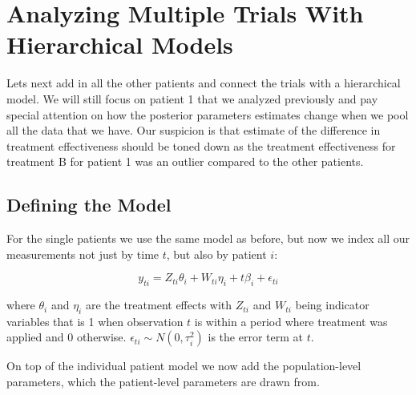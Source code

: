 \documentclass[12pt,a4paper,leqno]{report}
\theoremstyle{plain}
\theoremstyle{definition}
\theoremstyle{remark}
\begin{document}

\section{Analyzing Multiple Trials With Hierarchical Models}\label{pooling}

Lets next add in all the other patients and connect the trials with a hierarchical
model. We will still focus on patient 1 that we analyzed previously and pay special
attention on how the posterior parameters estimates change when we pool all the data
that we have. Our suspicion is that estimate of the difference in treatment effectiveness
should be toned down as the treatment effectiveness for treatment B for patient 1 was an
outlier compared to the other patients.

\subsection{Defining the Model}\label{hiermodel}

For the single patients we use the same model as before, but now we index all our
measurements not just by time \(t\), but also by patient \(i\):

\begin{def}\label{simplesinglepatientmodel}
    \begin{equation}\label{}
        y_{ti} = Z_{ti}\theta_{i} + W_{ti}\eta_{i} + t\beta_{i} + \epsilon_{ti}
    \end{equation}
\end{def} where \(\theta_{i} \) and \(\eta_{i} \) are the treatment effects with \(Z_{ti}\) and \(W_{ti}\) being indicator
variables that is 1 when observation \(t\) is within a period where treatment was applied and
0 otherwise. \(\epsilon_{ti} \sim N(0,\tau_{i}^2) \) is the error term at \(t\).

On top of the individual patient model we now add the population-level parameters, which the
patient-level parameters are drawn from.

\bigskip
\end{document}
